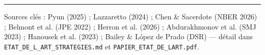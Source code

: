\documentclass[10pt,a4paper,twocolumn]{article}
\begin{document}
\vspace{4pt}
\hrule
\vspace{2pt}
{\footnotesize\color{gris} Sources clés : Pyun (2025) ; Lazzaretto (2024) ; Chen \& Sacerdote (NBER 2026) ; Belmont et al. (JPE 2022) ; Herron et al. (2026) ; Abdurakhmonov et al. (SMJ 2023) ; Hanousek et al. (2023) ; Bailey \& López de Prado (DSR) --- détail dans \texttt{ETAT\_DE\_L\_ART\_STRATEGIES.md} et \texttt{PAPIER\_ETAT\_DE\_LART.pdf}.}
\end{document}
